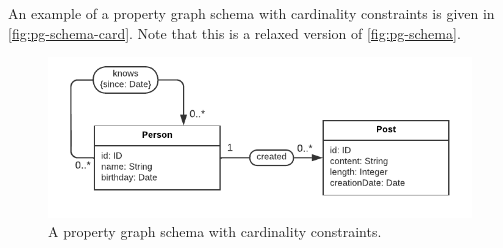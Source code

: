 \documentclass{article}
\begin{document}
An example of a property graph schema with cardinality constraints is given in \autoref{fig:pg-schema-card}. Note that this is a relaxed version of \autoref{fig:pg-schema}.

\begin{figure}[t]
  \centering
  \includegraphics{figures/pg-schema-card.pdf}
  \caption{A property graph schema with cardinality constraints.}
  \label{fig:pg-schema-card}
\end{figure}
\end{document}
